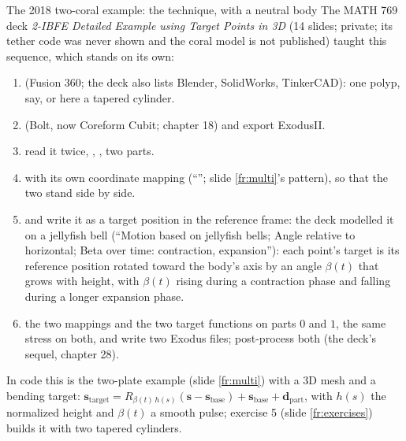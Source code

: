 \documentclass[aspectratio=169,11pt]{beamer}
\begin{document}
\begin{frame}{The 2018 two-coral example: the technique, with a neutral body}
\label{fr:corals}
\scriptsize
The MATH 769 deck \emph{2-IBFE Detailed Example using Target Points in 3D} (14 slides; private; its tether code was never shown and the coral model is not published) taught this sequence, which stands on its own:
\begin{enumerate}
  \item {} (Fusion 360; the deck also lists Blender, SolidWorks, TinkerCAD): one polyp, say, or here a tapered cylinder.
  \item {} (Bolt, now Coreform Cubit; chapter 18) and export ExodusII.
  \item {} read it twice, , , two parts.
  \item {} with its own coordinate mapping (``''; slide \ref{fr:multi}'s pattern), so that the two stand side by side.
  \item {} and write it as a target position in the reference frame: the deck modelled it on a jellyfish bell (``Motion based on jellyfish bells; Angle relative to horizontal; Beta over time: contraction, expansion''): each point's target is its reference position rotated toward the body's axis by an angle $\beta(t)$ that grows with height, with $\beta(t)$ rising during a contraction phase and falling during a longer expansion phase.
  \item {} the two mappings and the two target functions on parts $0$ and $1$, the same stress on both, and write two Exodus files; post-process both (the deck's sequel, chapter 28).
\end{enumerate}
\begin{punchbox}
\footnotesize In code this is the two-plate example (slide \ref{fr:multi}) with a 3D mesh and a bending target: $\mathbf{s}_{\mathrm{target}} = R_{\beta(t)\,h(s)}(\mathbf{s} - \mathbf{s}_{\mathrm{base}}) + \mathbf{s}_{\mathrm{base}} + \mathbf{d}_{\mathrm{part}}$, with $h(s)$ the normalized height and $\beta(t)$ a smooth pulse; exercise 5 (slide \ref{fr:exercises}) builds it with two tapered cylinders.
\end{punchbox}
\end{frame}
\end{document}
